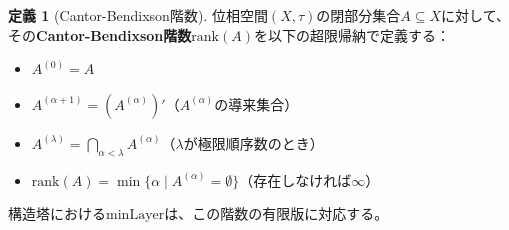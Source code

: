 \documentclass[a4paper,12pt]{ltjsarticle}
\theoremstyle{definition}
\newtheorem{definition}{定義}[section]
\begin{document}
\begin{definition}[Cantor-Bendixson階数]
位相空間$(X, \tau)$の閉部分集合$A \subseteq X$に対して、
その\textbf{Cantor-Bendixson階数}$\mathrm{rank}(A)$を以下の超限帰納で定義する：

\begin{itemize}
\item $A^{(0)} = A$
\item $A^{(\alpha+1)} = (A^{(\alpha)})'$（$A^{(\alpha)}$の導来集合）
\item $A^{(\lambda)} = \bigcap_{\alpha < \lambda} A^{(\alpha)}$（$\lambda$が極限順序数のとき）
\item $\mathrm{rank}(A) = \min\{\alpha \mid A^{(\alpha)} = \emptyset\}$（存在しなければ$\infty$）
\end{itemize}
\end{definition}

構造塔における$\mathrm{minLayer}$は、この階数の有限版に対応する。
\end{document}

